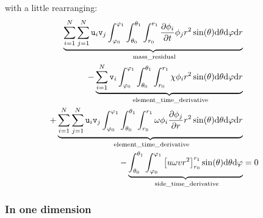 with a little rearranging:
\begin{equation}
\begin{split}
  \underbrace{\sum_{i=1}^N\sum_{j=1}^N\ui_i\vi_j\intr\doverd{\phi_i}{t}\phi_j \dVs}_\text{ mass\_residual}                    \\
- \underbrace{\sum_{i=1}^N\vi_i\intr\chi\phi_i \dVs}_\text{ element\_time\_derivative}                                        \\
+ \underbrace{\sum_{i=1}^N\sum_{j=1}^N\ui_i\vi_j\intr\omega\phi_i\doverd{\phi_j}{r} \dVs}_\text{ element\_time\_derivative}   \\
- \underbrace{\inttheta\intphy\left[u\omega v r^2\right]^{r_1}_{r_0}\sin(\theta)\dd\theta\dd\varphi}_\text{ side\_time\_derivative}
& = 0
\end{split}
\end{equation}

\subsubsection{In one dimension}

